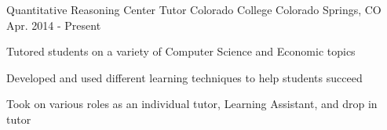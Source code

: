 \begin{cventries}

\vspace{-1.25em}
\cventry
{Quantitative Reasoning Center Tutor} %
{Colorado College} %
{Colorado Springs, CO} %
{Apr. 2014 - Present} %
{ %
\begin{cvitems}
\item {Tutored students on a variety of Computer Science and Economic topics}
\item {Developed and used different learning techniques to help students succeed}
\item {Took on various roles as an individual tutor, Learning Assistant, and drop in tutor}
\end{cvitems}
}






\end{cventries}
